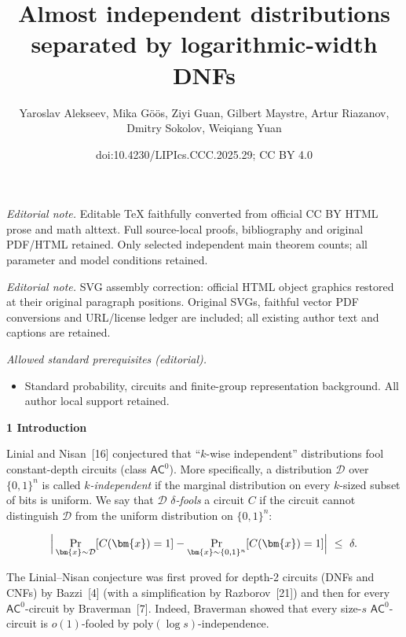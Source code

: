 \documentclass[10pt,a4paper]{article}
\title{Almost independent distributions separated by logarithmic-width DNFs}
\author{Yaroslav Alekseev, Mika Göös, Ziyi Guan, Gilbert Maystre, Artur Riazanov, Dmitry Sokolov, Weiqiang Yuan}
\date{doi:10.4230/LIPIcs.CCC.2025.29; CC BY 4.0}
\begin{document}
\maketitle
\noindent\textit{Editorial note.} Editable TeX faithfully converted from official CC BY HTML prose and math alttext. Full source-local proofs, bibliography and original PDF/HTML retained. Only selected independent main theorem counts; all parameter and model conditions retained.\par\medskip
\noindent\textit{Editorial note.} SVG assembly correction: official HTML object graphics restored at their original paragraph positions. Original SVGs, faithful vector PDF conversions and URL/license ledger are included; all existing author text and captions are retained.\par\medskip
\noindent\textit{Allowed standard prerequisites (editorial).}\begin{itemize}
\item Standard probability, circuits and finite-group representation background. All author local support retained.
\end{itemize}\medskip


\par\medskip\noindent\textbf{
1 Introduction}\par




Linial and Nisan [16] conjectured that “$k$-wise independent” distributions fool constant-depth circuits (class $\textsf{AC}^{0}$). More specifically, a distribution $\mathcal{D}$ over $\{0,1\}^{n}$ is called \emph{$k$-independent} if the marginal distribution on every $k$-sized subset of bits is uniform. We say that $\mathcal{D}$ \emph{$\delta$-fools} a circuit $C$ if the circuit cannot distinguish $\mathcal{D}$ from the uniform distribution on $\{0,1\}^{n}$:\par


\[\begin{gathered}
\Big{|}\Pr_{\bm{x}\sim\mathcal{D}}[C(\bm{x})=1]-\Pr_{\bm{x}\sim\{0,1\}^{n}}[C(\bm{x})=1]\Big{|}\nobreak\ \leq\nobreak\ \delta.
\end{gathered}\]


The Linial–Nisan conjecture was first proved for depth-2 circuits (DNFs and CNFs) by Bazzi [4] (with a simplification by Razborov [21]) and then for every $\textsf{AC}^{0}$-circuit by Braverman [7]. Indeed, Braverman showed that every size-$s$ $\textsf{AC}^{0}$-circuit is $o(1)$-fooled by $\mathrm{poly}(\log s)$-independence.\par
\end{document}
